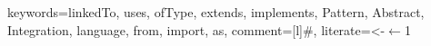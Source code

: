 
\usepackage{listings}

  {%
  keywords={linkedTo, uses, ofType, extends, implements,
    Pattern, Abstract, Integration, language, from, import, as},
  comment=[l]\#,
  literate={<-}{{$\leftarrow$}}{1}
}

